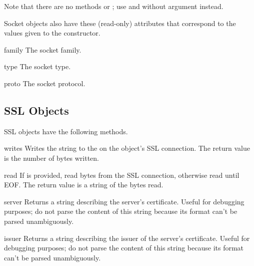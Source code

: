 Note that there are no methods  or ;
use  and  without  argument
instead.


Socket objects also have these (read-only) attributes that correspond
to the values given to the  constructor.

\begin{memberdesc}[socket]{family}
The socket family.
\end{memberdesc}

\begin{memberdesc}[socket]{type}
The socket type.
\end{memberdesc}

\begin{memberdesc}[socket]{proto}
The socket protocol.
\end{memberdesc}


\subsection{SSL Objects \label{ssl-objects}}

SSL objects have the following methods.

\begin{methoddesc}[SSL]{write}{s}
Writes the string  to the on the object's SSL connection.
The return value is the number of bytes written.
\end{methoddesc}

\begin{methoddesc}[SSL]{read}{}
If  is provided, read  bytes from the SSL connection, otherwise
read until EOF. The return value is a string of the bytes read.
\end{methoddesc}

\begin{methoddesc}[SSL]{server}{}
Returns a string describing the server's certificate.
Useful for debugging purposes; do not parse the content of this string
because its format can't be parsed unambiguously.
\end{methoddesc}

\begin{methoddesc}[SSL]{issuer}{}
Returns a string describing the issuer of the server's certificate.
Useful for debugging purposes; do not parse the content of this string
because its format can't be parsed unambiguously.
\end{methoddesc}

